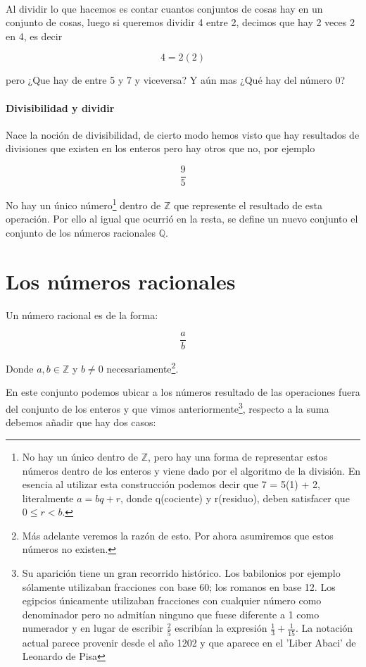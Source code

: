\documentclass{article}
\begin{document}
\paragraph{}Al dividir lo que hacemos es contar cuantos conjuntos de cosas hay en un conjunto de cosas, luego si queremos dividir 4 entre 2, decimos que hay 2 veces 2 en 4, es decir

$$4 = 2(2)$$

pero ¿Que hay de entre 5 y 7 y viceversa? Y aún mas ¿Qué hay del número 0?

\paragraph{Divisibilidad y dividir} Nace la noción de divisibilidad, de cierto modo hemos visto que hay resultados de divisiones que existen en los enteros pero hay otros que no, por ejemplo

$$\frac{9}{5}$$

No hay un único número\footnote{No hay un único dentro de $\mathbb{Z}$, pero hay una forma de representar estos números dentro de los enteros y viene dado por el algoritmo de la división. En esencia al utilizar esta construcción podemos decir que 7 = 5(1) + 2, literalmente $a = bq + r$, donde q(cociente) y r(residuo), deben satisfacer que $0 \leq r<b$.} dentro de $\mathbb{Z}$ que represente el resultado de esta operación. Por ello al igual que ocurrió en la resta, se define un nuevo conjunto el conjunto de los números racionales $\mathbb{Q}$.

\section{Los números racionales}

Un número racional es de la forma:

$$\frac{a}{b}$$

Donde $a, b \in \mathbb{Z}$ y $b \neq 0$ necesariamente\footnote{Más adelante veremos la razón de esto. Por ahora asumiremos que estos números no existen.}.

En este conjunto podemos ubicar a los números resultado de las operaciones fuera del conjunto de los enteros y que vimos anteriormente\footnote{Su aparición tiene un gran recorrido histórico. Los babilonios por ejemplo sólamente utilizaban fracciones con base 60; los romanos en base 12. Los egipcios únicamente utilizaban fracciones con cualquier número como denominador pero no admitían ninguno que fuese diferente a 1 como numerador y en lugar de escribir $\frac{2}{5}$ escribían la expresión $\frac{1}{3} + \frac{1}{15}$. La notación actual parece provenir desde el año 1202 y que aparece en el 'Liber Abaci' de Leonardo de Pisa\cite{patino_duque_1977}}, respecto a la suma debemos añadir que hay dos casos:
\end{document}
